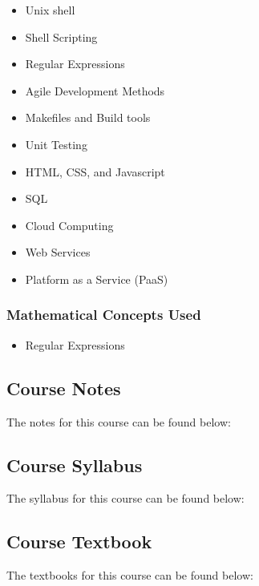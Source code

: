 {\begin{highlight}[\CSPBSoftDev]
        \begin{itemize}
            \item Unix shell
            \item Shell Scripting
            \item Regular Expressions
            \item Agile Development Methods
            \item Makefiles and Build tools
            \item Unit Testing
            \item HTML, CSS, and Javascript
            \item SQL
            \item Cloud Computing
            \item Web Services
            \item Platform as a Service (PaaS)
        \end{itemize}
        
        \subsubsection*{Mathematical Concepts Used}
    
        \begin{itemize}
            \item Regular Expressions
        \end{itemize}
    \end{highlight}
}

\subsection{Course Notes}

The notes for this course can be found below: \coursedoc{\CSPBSoftDevCourseNotes}

\subsection{Course Syllabus}

The syllabus for this course can be found below: \coursedoc{\CSPBSoftDevSyllabus}

\subsection{Course Textbook}

The textbooks for this course can be found below: \coursedoc{\CSPBSoftDevAgileTextbook} \coursedoc{\CSPBSoftDevEngTextbook} \coursedoc{\CSPBSoftDevProGitTextbook} \coursedoc{\CSPBSoftDevLinuxTextbook}
